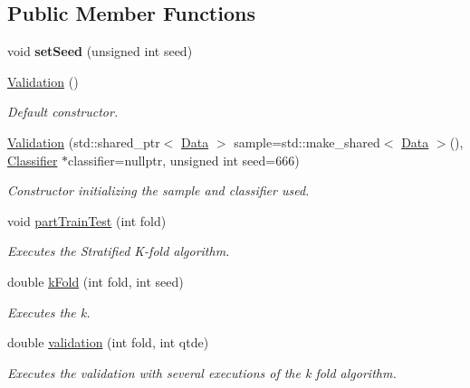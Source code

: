\subsection*{Public Member Functions}
\begin{DoxyCompactItemize}
\item 
\mbox{\label{class_validation_ab2cab637a39bfe01c8979fef7af04c85}} 
void {\bfseries set\+Seed} (unsigned int seed)
\item 
\mbox{\label{class_validation_ada040c6d31004cc277e2b74290eec266}} 
\hyperlink{class_validation_ada040c6d31004cc277e2b74290eec266}{Validation} ()
\begin{DoxyCompactList}\small\item\em Default constructor. \end{DoxyCompactList}\item 
\hyperlink{class_validation_abc3509e1641aa9fadf3bcdf3df368b2f}{Validation} (std\+::shared\+\_\+ptr$<$ \hyperlink{class_data}{Data} $>$ sample=std\+::make\+\_\+shared$<$ \hyperlink{class_data}{Data} $>$(), \hyperlink{class_classifier}{Classifier} $\ast$classifier=nullptr, unsigned int seed=666)
\begin{DoxyCompactList}\small\item\em Constructor initializing the sample and classifier used. \end{DoxyCompactList}\item 
void \hyperlink{class_validation_afc2e7f15bc873853b70e2cc3c47eecdc}{part\+Train\+Test} (int fold)
\begin{DoxyCompactList}\small\item\em Executes the Stratified K-\/fold algorithm. \end{DoxyCompactList}\item 
double \hyperlink{class_validation_a3aae72caef37b12a57aaf5cdd862de3a}{k\+Fold} (int fold, int seed)
\begin{DoxyCompactList}\small\item\em Executes the k. \end{DoxyCompactList}\item 
double \hyperlink{class_validation_a8d4b505b7e85e1fc9c90515ad3454977}{validation} (int fold, int qtde)
\begin{DoxyCompactList}\small\item\em Executes the validation with several executions of the k fold algorithm. \end{DoxyCompactList}\item 

\end{DoxyCompactItemize}
